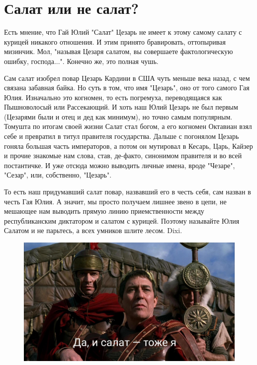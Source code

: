 
\chapter{Салат или не салат?}



Есть мнение, что Гай Юлий "Салат" Цезарь не имеет к этому самому салату с курицей никакого отношения. И этим принято бравировать, оттопыривая мизинчик. Мол, "называя Цезаря салатом, вы совершаете фактологическую ошибку, господа...". Конечно же, это полная чушь.


Сам салат изобрел повар Цезарь Кардини в США чуть меньше века назад, с чем связана забавная байка. Но суть в том, что имя "Цезарь", оно от того самого Гая Юлия. Изначально это когномен, то есть погремуха, переводящаяся как Пышноволосый или Рассекающий. И хоть наш Юлий Цезарь не был первым (Цезарями были и отец и дед как минимум), но точно самым популярным. Томушта по итогам своей жизни Салат стал богом, а его когномен Октавиан взял себе и превратил в титул правителя государства. Дальше с погонялом Цезарь гоняла большая часть императоров, а потом он мутировал в Кесарь, Царь, Кайзер и прочие знакомые нам слова, став, де-факто, синонимом правителя и во всей постантичке. И уже отсюда можно выводить личные имена, вроде "Чезаре", "Сезар", или, собственно, "Цезарь".


То есть наш придумавший салат повар, назвавший его в честь себя, сам назван в честь Гая Юлия. А значит, мы просто получаем лишнее звено в цепи, не мешающее нам выводить прямую линию приемственности между республиканским диктатором и салатом с курицей. Поэтому называйте Юлия Салатом и не парьтесь, а всех умников шлите лесом. Dixi.

\begin{figure}[h!tb] 
	\centering\includegraphics[scale=0.3]{Salat/161656392412378045.png}
\end{figure}
